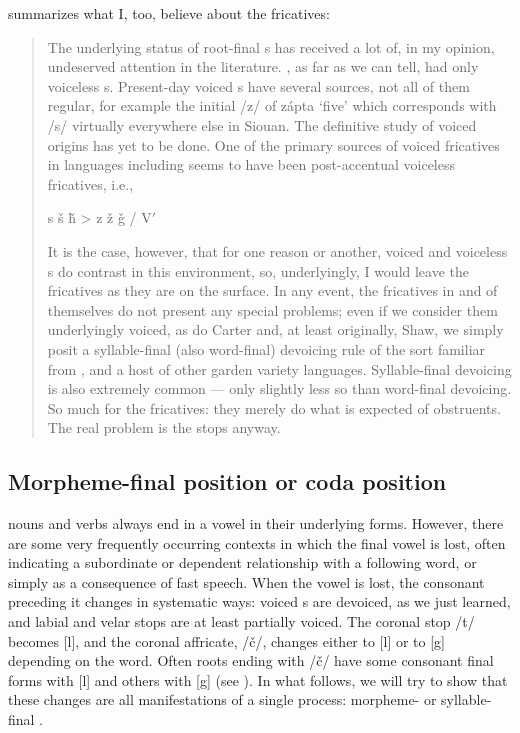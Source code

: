\documentclass[output=paper]{LSP/langsci}
\begin{document}
\citet[4]{Rankin2001} summarizes what I, too, believe about the fricatives:

\begin{quote}The underlying status of  root-final s has received a lot of, in my opinion, undeserved attention in the literature. , as far as we can tell, had only voiceless s. Present-day voiced s have several sources, not all of them regular, for example the initial /z/ of z\'apta `five' which corresponds with /s/ virtually everywhere else in Siouan. The definitive study of voiced  origins has yet to be done. One of the primary sources of voiced fricatives in  languages including  seems to have been post-accentual voiceless fricatives, i.e.,\vspace{-1em}
\begin{center}
s \v{s} \v{h} > z \v{z} \v{g} / V$'$  \underline{\hspace{1em}}
\end{center}
\vspace{-1em}
It is the case, however, that for one reason or another, voiced and voiceless s do contrast in this environment, so, underlyingly, I would leave the fricatives as they are on the surface. In any event, the fricatives in and of themselves do not present any special problems; even if we consider them underlyingly voiced, as do Carter and, at least originally, Shaw, we simply posit a syllable-final (also word-final) devoicing rule of the sort familiar from ,  and a host of other garden variety languages. Syllable-final devoicing is also extremely common --- only slightly less so than word-final devoicing. So much for the fricatives: they merely do what is expected of obstruents. The real problem is the stops anyway.\end{quote}

\subsection{Morpheme-final position or coda position}

 nouns and verbs always end in a vowel in their underlying forms. However, there are some very frequently occurring contexts in which the final vowel is lost, often indicating a subordinate or dependent relationship with a following word, or simply as a consequence of fast speech. When the vowel is lost, the consonant preceding it changes in systematic ways: voiced s are devoiced, as we just learned, and labial and velar stops are at least partially voiced. The coronal stop /t/ becomes [l], and the coronal affricate, /\v{c}/, changes either to [l] or to [g] depending on the word. Often roots ending with /\v{c}/ have some consonant final forms with [l] and others with [g] (see ). In what follows, we will try to show that these changes are all manifestations of a single process: morpheme- or syllable-final .
\end{document}
